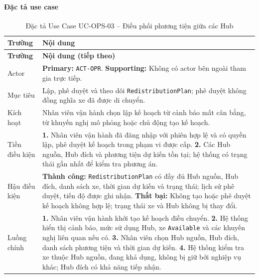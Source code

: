 \paragraph{Đặc tả use case}
\small
\begin{longtable}{|L{26mm}|L{118mm}|}
  \caption{Đặc tả Use Case UC-OPS-03 -- Điều phối phương tiện giữa các Hub}\label{tab:spec-UC-OPS-03}\\
  \hline
  \centering\arraybackslash\textbf{Trường} & \centering\arraybackslash\textbf{Nội dung}\\
  \hline
  \endfirsthead
  \hline
  \centering\arraybackslash\textbf{Trường} & \centering\arraybackslash\textbf{Nội dung (tiếp theo)}\\
  \hline
  \endhead
  Actor & \textbf{Primary:} \texttt{ACT-OPR}. \textbf{Supporting:} Không có actor bên ngoài tham gia trực tiếp.\\\hline
  Mục tiêu & Lập, phê duyệt và theo dõi \texttt{RedistributionPlan}; phê duyệt không đồng nghĩa xe đã được di chuyển.\\\hline
  Kích hoạt & Nhân viên vận hành chọn lập kế hoạch từ cảnh báo mất cân bằng, từ khuyến nghị mô phỏng hoặc chủ động tạo kế hoạch.\\\hline
  Tiền điều kiện &
    \textbf{1.} Nhân viên vận hành đã đăng nhập với phiên hợp lệ và có quyền lập, phê duyệt kế hoạch trong phạm vi được cấp.\newline
    \textbf{2.} Các Hub nguồn, Hub đích và phương tiện dự kiến tồn tại; hệ thống có trạng thái gần nhất để kiểm tra phương án.\\\hline
  Hậu điều kiện &
    \textbf{Thành công:} \texttt{RedistributionPlan} có đầy đủ Hub nguồn, Hub đích, danh sách xe, thời gian dự kiến và trạng thái; lịch sử phê duyệt, tiến độ được ghi nhận.\newline
    \textbf{Thất bại:} Không tạo hoặc phê duyệt kế hoạch không hợp lệ; trạng thái xe và Hub không bị thay đổi.\\\hline
  Luồng chính &
    \textbf{1.} Nhân viên vận hành khởi tạo kế hoạch điều chuyển.\newline
    \textbf{2.} Hệ thống hiển thị cảnh báo, mức sử dụng Hub, xe \texttt{Available} và các khuyến nghị liên quan nếu có.\newline
    \textbf{3.} Nhân viên chọn Hub nguồn, Hub đích, danh sách phương tiện và thời gian dự kiến.\newline
    \textbf{4.} Hệ thống kiểm tra xe thuộc Hub nguồn, đang khả dụng, không bị giữ bởi nghiệp vụ khác; Hub đích có khả năng tiếp nhận.\newline

\end{longtable}
